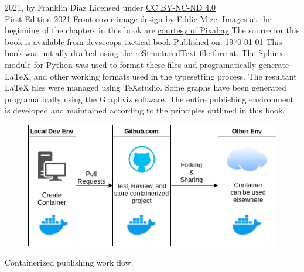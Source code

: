 \justify{}
\textcopyright{} 2021, by Franklin Diaz
\justify{}
Licensed under \href{https://creativecommons.org/licenses/by-nc-nd/4.0/}{CC BY-NC-ND 4.0} 
\faCreativeCommons\ \faCreativeCommonsBy\ \faCreativeCommonsSa\
\vspace{5mm}\\
First Edition 2021
\justify{}
Front cover image design by {\href{https://www.linkedin.com/in/eddiemize/}{Eddie Mize}}.
Images at the beginning of the chapters in this book are
\href{https://pixabay.com/service/terms/#license}{courtesy of Pixabay}
\justify{}
The source for this book is available from 
{\href{https://github.com/thedevilsvoice/devsecops-tactical-book}{devsecops-tactical-book}}
\vspace{3mm}
Published on: \today
\justify{}
This book was initially drafted using the reStructuredText file format.
The Sphinx module for Python was used to format these files and programatically
generate LaTeX, and other working formats used in the typesetting process. The
resultant LaTeX files were managed using TeXstudio.
\justify{}
Some graphs have been generated programatically using the Graphviz software.
The entire publishing environment is developed and maintained according
to the principles outlined in this book.
\vspace{5mm}
\centering
\vspace{0mm}
\begin{figure}[!htb]
	\centering
	\includegraphics[scale=0.75]{images/workflow.png}
\end{figure}
\vspace{2mm}
Containerized publishing work flow.
